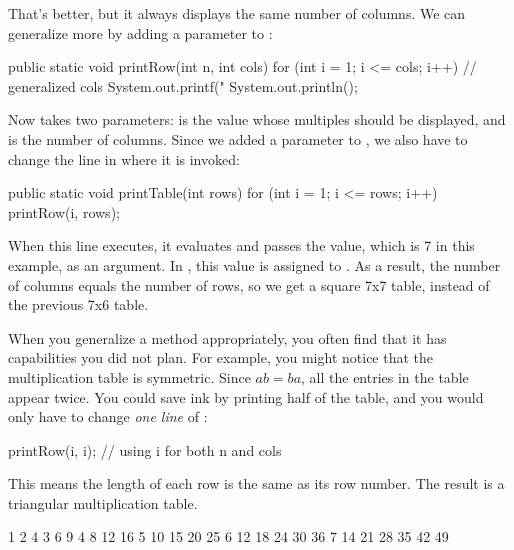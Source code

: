 That's better, but it always displays the same number of columns.
We can generalize more by adding a parameter to :

\begin{code}
public static void printRow(int n, int cols) {
    for (int i = 1; i <= cols; i++) {     // generalized cols
        System.out.printf("%
    }
    System.out.println();
}
\end{code}

Now  takes two parameters:  is the value whose multiples should be displayed, and  is the number of columns.
Since we added a parameter to , we also have to change the line in  where it is invoked:

\begin{code}
public static void printTable(int rows) {
    for (int i = 1; i <= rows; i++) {
        printRow(i, rows);
    }
}
\end{code}

When this line executes, it evaluates  and passes the value, which is 7 in this example, as an argument.
In , this value is assigned to .
As a result, the number of columns equals the number of rows, so we get a square 7x7 table, instead of the previous 7x6 table.


When you generalize a method appropriately, you often find that it has capabilities you did not plan.
For example, you might notice that the multiplication table is symmetric.
Since $ab = ba$, all the entries in the table appear twice.
You could save ink by printing half of the table, and you would only have to change {\em one line} of :

\begin{code}
printRow(i, i);  // using i for both n and cols
\end{code}

This means the length of each row is the same as its row number.
The result is a triangular multiplication table.

\begin{stdout}
   1
   2   4
   3   6   9
   4   8  12  16
   5  10  15  20  25
   6  12  18  24  30  36
   7  14  21  28  35  42  49
\end{stdout}

